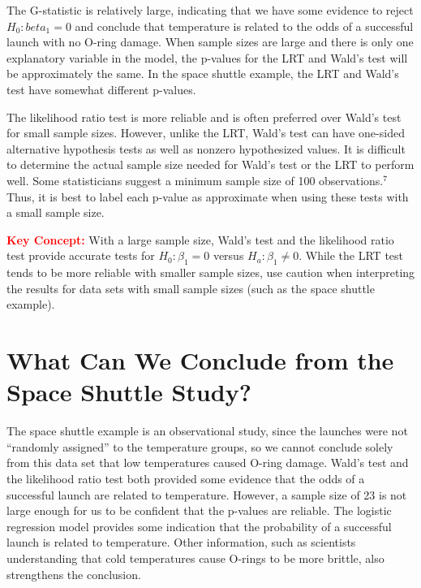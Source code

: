 \documentclass[
]{report}
\begin{document}
The G-statistic is relatively large, indicating that we have some evidence to reject \(H_0: beta_1 = 0\) and conclude that temperature is related to the odds of a successful launch with no O-ring damage. When sample sizes are large and there is only one explanatory variable in the model, the p-values for the LRT and Wald's test will be approximately the same. In the space shuttle example, the LRT and Wald's test have somewhat different p-values.

The likelihood ratio test is more reliable and is often preferred over Wald's test for small sample sizes. However, unlike the LRT, Wald's test can have one-sided alternative hypothesis tests as well as nonzero hypothesized values. It is difficult to determine the actual sample size needed for Wald's test or the LRT to perform well. Some statisticians suggest a minimum sample size of 100 observations.\(^7\) Thus, it is best to label each p-value as approximate when using these tests with a small sample size.

\Large

\textbf{\textcolor{red}{Key Concept:}}
\color{red}
With a large sample size, Wald's test and the likelihood ratio test provide accurate tests for \(H_0: \beta_1 = 0\) versus \(H_a: \beta_1 \neq 0\). While the LRT test tends to be more reliable with smaller sample sizes, use caution when interpreting the results for data sets with small sample sizes (such as the space shuttle example).
\color{black}
\normalsize

\section{\texorpdfstring{\textbf{What Can We Conclude from the Space Shuttle Study?}}{What Can We Conclude from the Space Shuttle Study?}}\label{what-can-we-conclude-from-the-space-shuttle-study}

The space shuttle example is an observational study, since the launches were not ``randomly assigned'' to the temperature groups, so we cannot conclude solely from this data set that low temperatures caused O-ring damage. Wald's test and the likelihood ratio test both provided some evidence that the odds of a successful launch are related to temperature. However, a sample size of 23 is not large enough for us to be confident that the p-values are reliable. The logistic regression model provides some indication that the probability of a successful launch is related to temperature. Other information, such as scientists understanding that cold temperatures cause O-rings to be more brittle, also strengthens the conclusion.
\end{document}
